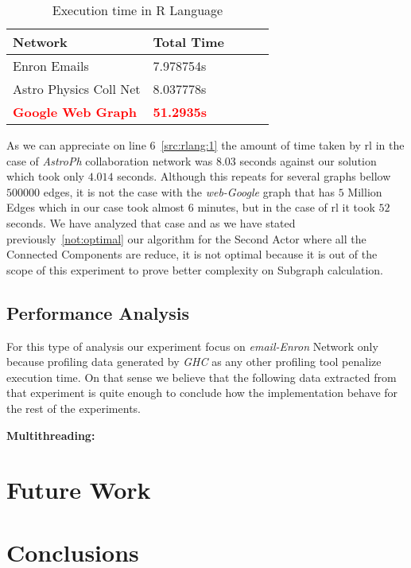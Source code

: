 \documentclass[12pt]{article}
\begin{document}
\begin{table}[H]
  \centering
  \begin{tabular}{|l|l|l|l|l|}
   \hline
   \textbf{Network} & \textbf{Total Time}\\
   \hline
   Enron Emails & 7.978754s \\
   \hline
   Astro Physics Coll Net & 8.037778s \\
   \hline
   \textbf{\textcolor{red}{Google Web Graph}} & \textbf{\textcolor{red}{51.2935s}} \\
   \hline
  \end{tabular}
 \caption{Execution time in R Language}
 \label{table:6}
 \end{table}

As we can appreciate on line 6~\ref{src:rlang:1} the amount of time taken by \acrshort{rl} in the case of \textit{AstroPh} collaboration network was $8.03$ seconds against
our solution which took only $4.014$ seconds. 
Although this repeats for several graphs bellow $500000$ edges, it is not the case with the \textit{web-Google} graph that has $5$ Million Edges which in our case took almost $6$ minutes, 
but in the case of \acrshort{rl} it took $52$ seconds. We have analyzed that case and as we have stated previously~\ref{not:optimal} our algorithm for the Second Actor where all the Connected Components are 
reduce, it is not optimal because it is out of the scope of this experiment to prove better complexity on Subgraph calculation.

\subsection{Performance Analysis}
For this type of analysis our experiment focus on \textit{email-Enron} Network only because profiling data generated by \textit{GHC} as any other profiling tool penalize execution time. 
On that sense we believe that the following data extracted from that experiment is quite enough to conclude how the implementation behave for the rest of the experiments.

\textbf{Multithreading:}


\section{Future Work}

\section{Conclusions}

\clearpage

\printglossary[type=\acronymtype]

\printglossary




\appendix
\end{document}
